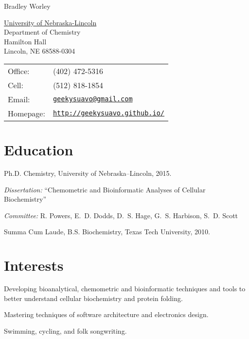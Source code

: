 \documentclass[letterpaper]{article}
\def\name{Bradley Worley}
\renewenvironment{itemize}{
  \begin{list}{}{
    \setlength{\leftmargin}{1.5em}
  }
}{
  \end{list}
}
\begin{document}
{\huge \name}
\vspace{0.25in}

\begin{minipage}{0.45\linewidth}
  \href{http://www.unl.edu/}{University of Nebraska-Lincoln} \\
  Department of Chemistry \\
  Hamilton Hall \\
  Lincoln, NE 68588-0304
\end{minipage}
\begin{minipage}{0.45\linewidth}
  \begin{tabular}{ll}
    Office: & (402) 472-5316 \\
    Cell: &  (512) 818-1854 \\
    Email: & \href{mailto:geekysuavo@gmail.com}
                     {\tt geekysuavo@gmail.com} \\
    Homepage: & \href{http://geekysuavo.github.io/}
                 {\tt http://geekysuavo.github.io/} \\
  \end{tabular}
\end{minipage}


\section*{Education}

\begin{itemize}
  \item Ph.D. Chemistry, University of Nebraska--Lincoln, 2015.
  \begin{itemize}
    \item \emph{Dissertation:} ``Chemometric and Bioinformatic Analyses
      of Cellular Biochemistry''
    \item \emph{Committee:}
      R. Powers, E.~D. Dodds, D.~S. Hage,
      G.~S. Harbison, S.~D. Scott
  \end{itemize}
  \item Summa Cum Laude, B.S. Biochemistry, Texas Tech University, 2010.
\end{itemize}


\section*{Interests}

\begin{itemize}
\item{
  Developing bioanalytical, chemometric and bioinformatic techniques and
  tools to better understand cellular biochemistry and protein folding.
}
\item{
  Mastering techniques of software architecture and electronics design.
}
\item{
  Swimming, cycling, and folk songwriting.
}
\end{itemize}
\end{document}
